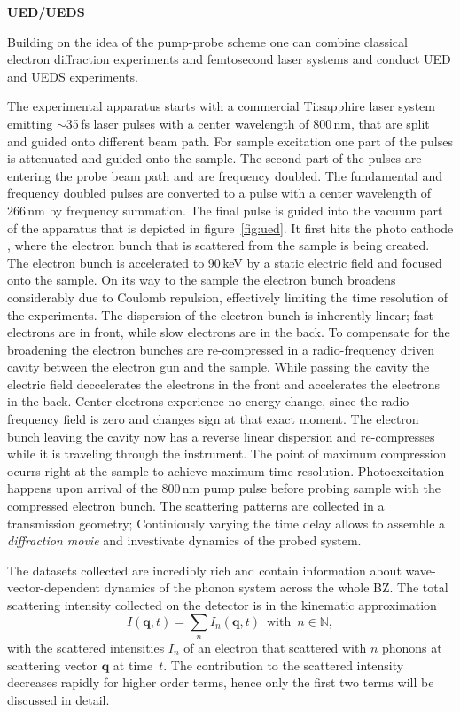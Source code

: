 \textbf{UED/UEDS}

Building on the idea of the pump-probe scheme one can combine classical electron diffraction experiments and femtosecond laser systems and conduct \ac{UED} and \ac{UEDS} experiments.

The experimental apparatus starts with a commercial Ti:sapphire laser system emitting $\sim$35\,fs laser pulses with a center wavelength of 800\,nm, that are split and guided onto different beam path.
For sample excitation one part of the pulses is attenuated and guided onto the sample.
The second part of the pulses are entering the probe beam path and are frequency doubled. The fundamental and frequency doubled pulses are converted to a pulse with a center wavelength of 266\,nm by frequency summation.
The final pulse is guided into the vacuum part of the apparatus that is depicted in figure~\ref{fig:ued}.
It first hits the photo cathode , where the electron bunch that is scattered from the sample is being created.
The electron bunch is accelerated to 90\,keV by a static electric field and focused onto the sample.
On its way to the sample the electron bunch broadens considerably due to Coulomb repulsion, effectively limiting the time resolution of the experiments.
The dispersion of the electron bunch is inherently linear; fast electrons are in front, while slow electrons are in the back.
To compensate for the broadening the electron bunches are re-compressed in a radio-frequency driven cavity between the electron gun and the sample.
While passing the cavity the electric field deccelerates the electrons in the front and accelerates the electrons in the back.
Center electrons experience no energy change, since the radio-frequency field is zero and changes sign at that exact moment.
The electron bunch leaving the cavity now has a reverse linear dispersion and re-compresses while it is traveling through the instrument.
The point of maximum compression ocurrs right at the sample to achieve maximum time resolution.
Photoexcitation happens upon arrival of the 800\,nm pump pulse before probing sample with the compressed electron bunch.
The scattering patterns are collected in a transmission geometry; Continiously varying the time delay allows to assemble a \emph{diffraction movie} and investivate dynamics of the probed system.

The datasets collected are incredibly rich and contain information about wave-vector-dependent dynamics of the phonon system across the whole \ac{BZ}.
The total scattering intensity collected on the detector is in the kinematic approximation
\begin{equation} I(\mathbf{q},t) = \sum_n I_n(\mathbf{q},t)\enspace\text{with}\enspace n \in\mathbb{N},\label{eq:I}\end{equation}
with the scattered intensities $I_n$ of an electron that scattered with $n$ phonons at scattering vector $\mathbf{q}$ at time~$t$.
The contribution to the scattered intensity decreases rapidly for higher order terms, hence only the first two terms will be discussed in detail.

